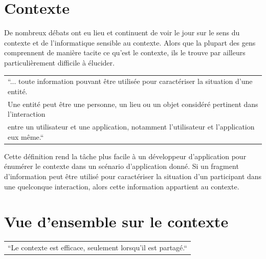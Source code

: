 \section{Contexte}

De nombreux débats ont eu lieu et continuent de voir le jour sur le sens du
contexte et de l'informatique sensible au contexte. Alors que la plupart des
gens comprennent de manière tacite ce qu'est le contexte, ils le trouve par
ailleurs particulièrement difficile à élucider.

{%
    \centering
    \begin{tabular}{l}
        ``... toute information pouvant être utilisée pour caractériser la
        situation d'une entité.\\ 
        Une entité peut être une personne, un lieu ou un objet considéré
        pertinent dans l'interaction \\ 
        entre un utilisateur et une application, notamment l'utilisateur et
        l'application eux même.``
        \cite{abowd_baltzer_1997} \\
    \end{tabular}
}%

Cette définition rend la tâche plus facile à un développeur d'application pour
énumérer le contexte dans un scénario d'application donné. Si un fragment
d'information peut être utilisé pour caractériser la situation d'un participant
dans une quelconque interaction, alors cette information appartient au contexte.

\section{Vue d'ensemble sur le contexte}

{%
    \centering
    \begin{tabular}{l}
        ``Le contexte est efficace, seulement lorsqu'il est partagé.``
        \cite{winograd_architectures_2001} \\
    \end{tabular}
}%

